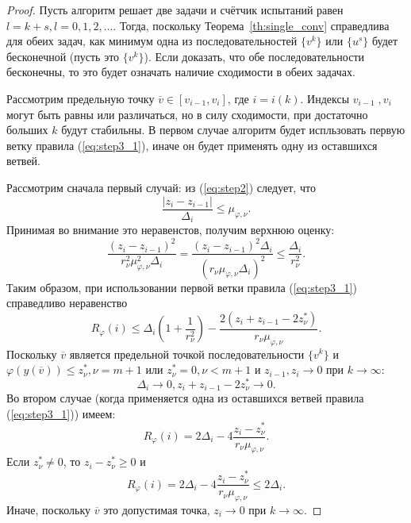 \begin{proof}
  Пусть алгоритм решает две задачи и счётчик испытаний равен \(l = k + s, l=0,1,2,\dots\).
  Тогда, поскольку Теорема~\ref{th:single_conv} справедлива для обеих задач, как минимум одна из последовательностей
  \(\{v^k\}\) или \(\{u^s\}\) будет бесконечной (пусть это \(\{v^k\}\)).
  Если доказать, что обе последовательности бесконечны, то это будет означать наличие сходимости в обеих задачах.

  Рассмотрим предельную точку \(\overline{v}\in [v_{i-1},v_i]\), где \(i=i(k)\). Индексы \(v_{i-1}\;,v_i\)
  могут быть равны или различаться, но в силу сходимости, при достаточно больших \(k\) будут стабильны.
  В первом случае алгоритм будет испльзовать первую ветку правила (\ref{eq:step3_1}), иначе он будет применять одну из оставшихся ветвей.

  Рассмотрим сначала первый случай: из (\ref{eq:step2}) следует, что
  \begin{displaymath}
    \frac{|z_i-z_{i-1}|}{\Delta_i} \leqslant \mu_{\varphi,\nu}.
  \end{displaymath}
  Принимая во внимание это неравенстов, получим верхнюю оценку:
  \begin{displaymath}
    \frac{(z_i-z_{i-1})^2}{r_\nu^2\mu_{\varphi,\nu}^2\Delta_i}=\frac{(z_i-z_{i-1})^2\Delta_i}{(r_\nu\mu_{\varphi,\nu}\Delta_i)^2}
    \leqslant \frac{\Delta_i}{r_\nu^2}.
  \end{displaymath}
  Таким образом, при использовании первой ветки правила (\ref{eq:step3_1}) справедливо неравенство
  \begin{equation}
    \label{eq:th1}
    R_\varphi(i)\leqslant\Delta_i(1 + \frac{1}{r_\nu^2}) - \frac{2(z_i+z_{i-1}-2z^*_\nu)}{r_\nu\mu_{\varphi,\nu}}.
  \end{equation}
  Поскольку \(\overline{v}\) является предельной точкой последовательности \(\{v^k\}\) и \(\varphi(y(\overline{v}))\leqslant z^*_{\nu}, \nu=m+1\) или
  \(z^*_\nu=0, \nu<m+1\) и \(z_{i-1},z_i\to 0\) при \(k\to\infty\):
  \begin{equation}
    \label{eq:th2}
    \Delta_i\to 0, z_i+z_{i-1} - 2 z_\nu^*\to 0.
  \end{equation}
  Во втором случае (когда применяется одна из оставшихся ветвей правила (\ref{eq:step3_1})) имеем:
  \begin{displaymath}
    R_\varphi(i)=2\Delta_i - 4\frac{z_i-z^*_\nu}{r_\nu\mu_{\varphi,\nu}}.
  \end{displaymath}
  Если \(z^*_\nu \ne 0\), то \(z_i-z^*_\nu \geqslant 0\) и
  \begin{equation}
    \label{eq:th3}
    R_\varphi(i)=2\Delta_i - 4\frac{z_i-z^*_\nu}{r_\nu\mu_{\varphi,\nu}} \leqslant 2\Delta_i.
  \end{equation}
  Иначе, поскольку \(\overline{v}\) это допустимая точка, \(z_i\to 0\) при \(k\to\infty\).


\end{proof}
